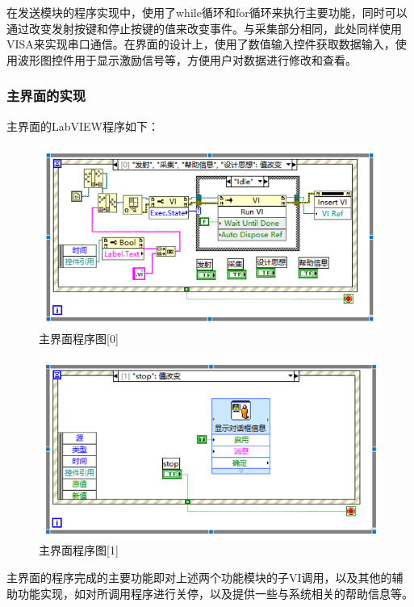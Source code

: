 \documentclass[UTF8]{article}
\begin{document}
在发送模块的程序实现中，使用了while循环和for循环来执行主要功能，同时可以通过改变发射按键和停止按键的值来改变事件。与采集部分相同，此处同样使用VISA来实现串口通信。在界面的设计上，使用了数值输入控件获取数据输入，使用波形图控件用于显示激励信号等，方便用户对数据进行修改和查看。

\subsubsection{主界面的实现}
主界面的LabVIEW程序如下：
\begin{figure}[H]
    \centering %
    \includegraphics[width=1\textwidth]{figure/主界面-程序0.png} 
    \caption{主界面程序图[0]} %
\end{figure}
\begin{figure}[H]
    \centering %
    \includegraphics[width=1\textwidth]{figure/主界面-程序1.png} 
    \caption{主界面程序图[1]} %
\end{figure}
主界面的程序完成的主要功能即对上述两个功能模块的子VI调用，以及其他的辅助功能实现，如对所调用程序进行关停，以及提供一些与系统相关的帮助信息等。
\end{document}
